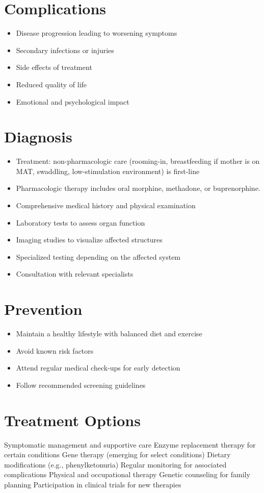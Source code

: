 \section{Complications}
\begin{itemize}[noitemsep]
  \item Disease progression leading to worsening symptoms
  \item Secondary infections or injuries
  \item Side effects of treatment
  \item Reduced quality of life
  \item Emotional and psychological impact
\end{itemize}
\section{Diagnosis}
\begin{itemize}[noitemsep]
  \item Treatment: non-pharmacologic care (rooming-in, breastfeeding if mother is on MAT, swaddling, low-stimulation environment) is first-line
  \item Pharmacologic therapy includes oral morphine, methadone, or buprenorphine.
  \item Comprehensive medical history and physical examination
  \item Laboratory tests to assess organ function
  \item Imaging studies to visualize affected structures
  \item Specialized testing depending on the affected system
  \item Consultation with relevant specialists
\end{itemize}
\section{Prevention}
\begin{itemize}[noitemsep]
  \item Maintain a healthy lifestyle with balanced diet and exercise
  \item Avoid known risk factors
  \item Attend regular medical check-ups for early detection
  \item Follow recommended screening guidelines
\end{itemize}
\section{Treatment Options}
Symptomatic management and supportive care Enzyme replacement therapy for certain conditions Gene therapy (emerging for select conditions) Dietary modifications (e.g., phenylketonuria) Regular monitoring for associated complications Physical and occupational therapy Genetic counseling for family planning Participation in clinical trials for new therapies

